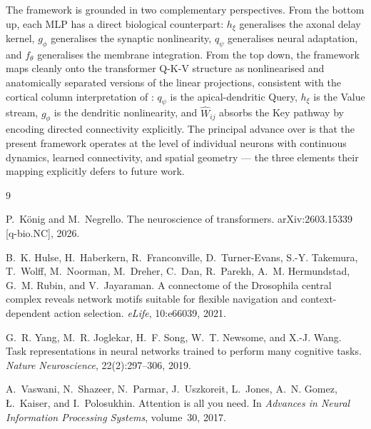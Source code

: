 \documentclass[11pt]{article}
\begin{document}
The framework is grounded in two complementary perspectives. From the
bottom up, each MLP has a direct biological counterpart: $h_\xi$ generalises
the axonal delay kernel, $g_\phi$ generalises the synaptic nonlinearity,
$q_\psi$ generalises neural adaptation, and $f_\theta$ generalises the
membrane integration. From the top down, the framework maps cleanly onto
the transformer Q-K-V structure as nonlinearised and anatomically separated
versions of the linear projections, consistent with the cortical column
interpretation of \citet{konig2026}: $q_\psi$ is the apical-dendritic
Query, $h_\xi$ is the Value stream, $g_\phi$ is the dendritic nonlinearity,
and $\hat{W}_{ij}$ absorbs the Key pathway by encoding directed connectivity
explicitly. The principal advance over \citet{konig2026} is that the present
framework operates at the level of individual neurons with continuous
dynamics, learned connectivity, and spatial geometry --- the three elements
their mapping explicitly defers to future work.


\begin{thebibliography}{9}

P.~K\"{o}nig and M.~Negrello.
\newblock The neuroscience of transformers.
\newblock arXiv:2603.15339 [q-bio.NC], 2026.

B.~K. Hulse, H.~Haberkern, R.~Franconville, D.~Turner-Evans, S.-Y. Takemura,
  T.~Wolff, M.~Noorman, M.~Dreher, C.~Dan, R.~Parekh, A.~M. Hermundstad,
  G.~M. Rubin, and V.~Jayaraman.
\newblock A connectome of the {D}rosophila central complex reveals network
  motifs suitable for flexible navigation and context-dependent action selection.
\newblock \emph{eLife}, 10:e66039, 2021.

G.~R. Yang, M.~R. Joglekar, H.~F. Song, W.~T. Newsome, and X.-J. Wang.
\newblock Task representations in neural networks trained to perform many
  cognitive tasks.
\newblock \emph{Nature Neuroscience}, 22(2):297--306, 2019.

A.~Vaswani, N.~Shazeer, N.~Parmar, J.~Uszkoreit, L.~Jones, A.~N. Gomez,
  \L.~Kaiser, and I.~Polosukhin.
\newblock Attention is all you need.
\newblock In \emph{Advances in Neural Information Processing Systems},
  volume~30, 2017.

\end{thebibliography}
\end{document}
